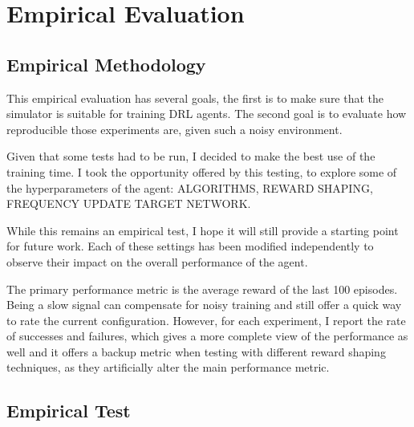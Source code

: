 \section{Empirical Evaluation}


\subsection{Empirical Methodology}


\begin{textblock}
This empirical evaluation has several goals, the first is to make sure that the simulator is suitable for training DRL agents. The second goal is to evaluate how reproducible those experiments are, given such a noisy environment.

Given that some tests had to be run,  I decided to make the best use of the training time. I took the opportunity offered by this testing, to explore some of the hyperparameters of the agent: ALGORITHMS, REWARD SHAPING, FREQUENCY UPDATE TARGET NETWORK.

While this remains an empirical test, I hope it will still provide a starting point for future work.
Each of these settings has been modified independently to observe their impact on the overall performance of the agent.   

The primary performance metric is the average reward of the last 100 episodes. Being a slow signal can compensate for noisy training and still offer a quick way to rate the current configuration. However, for each experiment, I report the rate of successes and failures, which gives a more complete view of the performance as well and it offers a backup metric when testing with different reward shaping techniques, as they artificially alter the main performance metric.
\end{textblock}

\newpage

\subsection{Empirical Test}

